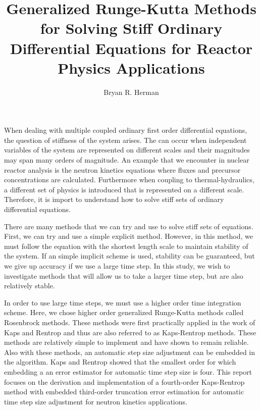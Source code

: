 \documentclass{ansconf}
\begin{document}
\title{Generalized Runge-Kutta Methods for Solving Stiff Ordinary Differential Equations for Reactor Physics Applications}

\author{Bryan R. Herman}

\maketitle


When dealing with multiple coupled ordinary first order differential equations, the question of stiffness of the system arises. The can occur when independent variables of the system are represented on different scales and their magnitudes may span many orders of magnitude. An example that we encounter in nuclear reactor analysis is the neutron kinetics equations where fluxes and precursor concentrations are calculated. Furthermore when coupling to thermal-hydraulics, a different set of physics is introduced that is represented on a different scale. Therefore, it is import to understand how to solve stiff sets of ordinary differential equations.

There are many methods that we can try and use to solve stiff sets of equations. First, we can try and use a simple explicit method. However, in this method, we must follow the equation with the shortest length scale to maintain stability of the system. If an simple implicit scheme is used, stability can be guaranteed, but we give up accuracy if we use a large time step. In this study, we wish to investigate methods that will allow us to take a larger time step, but are also relatively stable. 

In order to use large time steps, we must use a higher order time integration scheme. Here, we chose higher order generalized Runge-Kutta methods called Rosenbrock methods. These methods were first practically applied in the work of Kaps and Rentrop and thus are also referred to as Kaps-Rentrop methods. These methods are relatively simple to implement and have shown to remain reliable. Also with these methods, an automatic step size adjustment can be embedded in the algorithm. Kaps and Rentrop showed that the smallest order for which embedding a an error estimator for automatic time step size is four. This report focuses on the derivation and implementation of a fourth-order Kaps-Rentrop method with embedded third-order truncation error estimation for automatic time step size adjustment for neutron kinetics applications.
\end{document}
